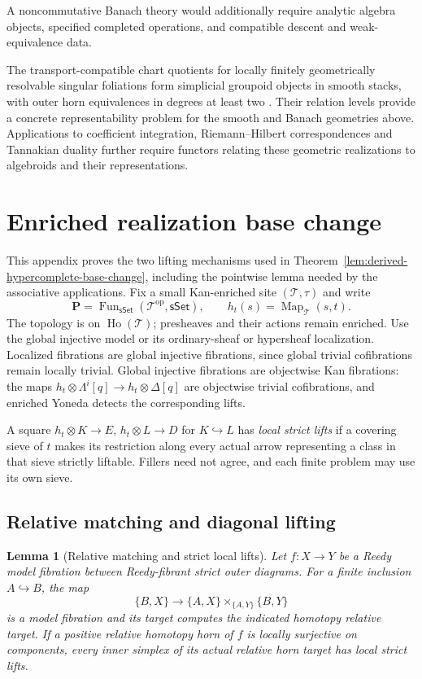 \documentclass[12pt]{amsart}
\newtheorem{lem}[thm]{Lemma}
\theoremstyle{definition}
\theoremstyle{remark}
\numberwithin{equation}{section}
\newcommand{\CT}{\mathcal T}
\newcommand{\sSet}{\mathsf{sSet}}
\newcommand{\op}{\mathrm{op}}
\DeclareMathOperator{\Map}{Map}
\DeclareMathOperator{\Fun}{Fun}
\begin{document}
A noncommutative Banach theory
would additionally require analytic
algebra objects, specified completed operations,
and compatible descent and weak-equivalence data.

The transport-compatible chart quotients for locally finitely
geometrically resolvable singular foliations form simplicial
groupoid objects in smooth stacks, with outer horn equivalences
in degrees at least two \cite[Theorem~E]{ZengHigherHolonomy}.
Their relation levels provide a concrete representability problem
for the smooth and Banach geometries above. Applications to
coefficient integration, Riemann--Hilbert correspondences and
Tannakian duality further require functors relating these
geometric realizations to algebroids and their representations.


\appendix
\section{Enriched realization base change}
\label{app:enriched-realization}

This appendix proves the two lifting mechanisms used in
Theorem~\ref{lem:derived-hypercomplete-base-change}, including
the pointwise lemma needed by the associative applications.
Fix a small Kan-enriched site $(\CT,\tau)$ and write
\[
 \mathbf P=\Fun_{\sSet}(\CT^\op,\sSet),\qquad
 h_t(s)=\Map_{\CT}(s,t).
\]
The topology is on $\operatorname{Ho}(\CT)$; presheaves and
their actions remain enriched. Use the global injective model
or its ordinary-sheaf or hypersheaf localization.
Localized fibrations are global injective fibrations, since
global trivial cofibrations remain locally trivial.
Global injective fibrations are objectwise Kan fibrations:
the maps $h_t\otimes\Lambda^i[q]\to h_t\otimes\Delta[q]$
are objectwise trivial cofibrations, and enriched Yoneda
detects the corresponding lifts.

A square $h_t\otimes K\to E$, $h_t\otimes L\to D$ for
$K\hookrightarrow L$ has \emph{local strict lifts} if a
covering sieve of $t$ makes its restriction along every
actual arrow representing a class in that sieve strictly
liftable. Fillers need not agree, and each finite problem
may use its own sieve.

\subsection{Relative matching and diagonal lifting}

\begin{lem}[Relative matching and strict local lifts]
Let $f:X\to Y$ be a Reedy model fibration between
Reedy-fibrant strict outer diagrams. For a finite inclusion
$A\hookrightarrow B$, the map
\[
 \{B,X\}\longrightarrow
 \{A,X\}\times_{\{A,Y\}}\{B,Y\}
\]
is a model fibration and its target computes the indicated
homotopy relative target.
\label{lem:enriched-relative-matching}
If a positive relative homotopy horn of $f$ is locally
surjective on components, every inner simplex of its
actual relative horn target has local strict lifts.
\end{lem}
\end{document}

